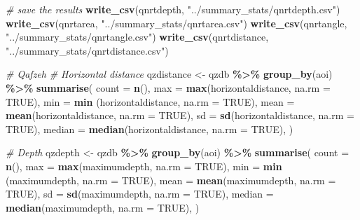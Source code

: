 \documentclass[
]{article}
\newenvironment{Shaded}{\begin{snugshade}}{\end{snugshade}}
\newcommand{\AttributeTok}[1]{\textcolor[rgb]{0.13,0.29,0.53}{#1}}
\newcommand{\CommentTok}[1]{\textcolor[rgb]{0.56,0.35,0.01}{\textit{#1}}}
\newcommand{\ConstantTok}[1]{\textcolor[rgb]{0.56,0.35,0.01}{#1}}
\newcommand{\FunctionTok}[1]{\textcolor[rgb]{0.13,0.29,0.53}{\textbf{#1}}}
\newcommand{\NormalTok}[1]{#1}
\newcommand{\OtherTok}[1]{\textcolor[rgb]{0.56,0.35,0.01}{#1}}
\newcommand{\SpecialCharTok}[1]{\textcolor[rgb]{0.81,0.36,0.00}{\textbf{#1}}}
\newcommand{\StringTok}[1]{\textcolor[rgb]{0.31,0.60,0.02}{#1}}
\begin{document}
\begin{Shaded}
\begin{Highlighting}[]
\CommentTok{\# save the results }
\FunctionTok{write\_csv}\NormalTok{(qnrtdepth, }\StringTok{"../summary\_stats/qnrtdepth.csv"}\NormalTok{)}
\FunctionTok{write\_csv}\NormalTok{(qnrtarea, }\StringTok{"../summary\_stats/qnrtarea.csv"}\NormalTok{)}
\FunctionTok{write\_csv}\NormalTok{(qnrtangle, }\StringTok{"../summary\_stats/qnrtangle.csv"}\NormalTok{)}
\FunctionTok{write\_csv}\NormalTok{(qnrtdistance, }\StringTok{"../summary\_stats/qnrtdistance.csv"}\NormalTok{)}

\CommentTok{\# Qafzeh}
\CommentTok{\# Horizontal distance}
\NormalTok{qzdistance }\OtherTok{\textless{}{-}}\NormalTok{ qzdb }\SpecialCharTok{\%\textgreater{}\%} \FunctionTok{group\_by}\NormalTok{(aoi) }\SpecialCharTok{\%\textgreater{}\%}
      \FunctionTok{summarise}\NormalTok{(}
      \AttributeTok{count =} \FunctionTok{n}\NormalTok{(),}
      \AttributeTok{max =} \FunctionTok{max}\NormalTok{(horizontaldistance, }\AttributeTok{na.rm =} \ConstantTok{TRUE}\NormalTok{),}
      \AttributeTok{min =} \FunctionTok{min}\NormalTok{ (horizontaldistance, }\AttributeTok{na.rm =} \ConstantTok{TRUE}\NormalTok{),}
      \AttributeTok{mean =} \FunctionTok{mean}\NormalTok{(horizontaldistance, }\AttributeTok{na.rm =} \ConstantTok{TRUE}\NormalTok{),}
      \AttributeTok{sd =} \FunctionTok{sd}\NormalTok{(horizontaldistance, }\AttributeTok{na.rm =} \ConstantTok{TRUE}\NormalTok{),}
      \AttributeTok{median =} \FunctionTok{median}\NormalTok{(horizontaldistance, }\AttributeTok{na.rm =} \ConstantTok{TRUE}\NormalTok{),}
\NormalTok{  ) }

\CommentTok{\# Depth}
\NormalTok{qzdepth }\OtherTok{\textless{}{-}}\NormalTok{ qzdb }\SpecialCharTok{\%\textgreater{}\%} \FunctionTok{group\_by}\NormalTok{(aoi) }\SpecialCharTok{\%\textgreater{}\%}
      \FunctionTok{summarise}\NormalTok{(}
      \AttributeTok{count =} \FunctionTok{n}\NormalTok{(),}
      \AttributeTok{max =} \FunctionTok{max}\NormalTok{(maximumdepth, }\AttributeTok{na.rm =} \ConstantTok{TRUE}\NormalTok{),}
      \AttributeTok{min =} \FunctionTok{min}\NormalTok{ (maximumdepth, }\AttributeTok{na.rm =} \ConstantTok{TRUE}\NormalTok{),}
      \AttributeTok{mean =} \FunctionTok{mean}\NormalTok{(maximumdepth, }\AttributeTok{na.rm =} \ConstantTok{TRUE}\NormalTok{),}
      \AttributeTok{sd =} \FunctionTok{sd}\NormalTok{(maximumdepth, }\AttributeTok{na.rm =} \ConstantTok{TRUE}\NormalTok{),}
      \AttributeTok{median =} \FunctionTok{median}\NormalTok{(maximumdepth, }\AttributeTok{na.rm =} \ConstantTok{TRUE}\NormalTok{),}
\NormalTok{  ) }


\end{Highlighting}
\end{Shaded}
\end{document}
